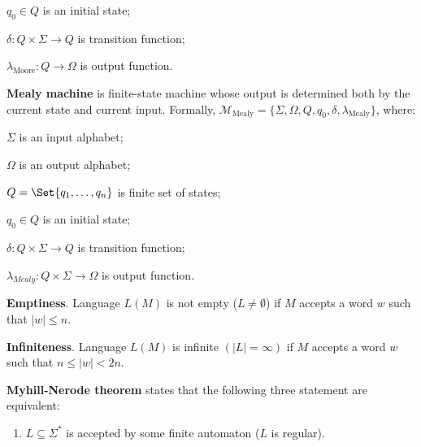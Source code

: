 \documentclass[a4paper,10pt]{article}
\begin{document}
\begin{terms}
\begin{terms}
        \item $q_0 \in Q$ is an initial state;

        \item $\delta \colon Q \times \Sigma \to Q$ is transition function;

        \item $\lambda_\text{Moore} \colon Q \to \Omega$ is output function.
    \end{terms}

    \item \textbf{Mealy machine} is finite-state machine whose output is determined both by the current state and current input.
    Formally, $\mathcal{M}_\text{Mealy} = \{\Sigma, \Omega, Q, q_0, \delta, \lambda_\text{Mealy}\}$, where:

    \begin{terms}
        \item $\Sigma$ is an input alphabet;

        \item $\Omega$ is an output alphabet;

        \item $Q = \Set{q_1, \dots, q_n}$ is finite set of states;

        \item $q_0 \in Q$ is an initial state;

        \item $\delta \colon Q \times \Sigma \to Q$ is transition function;

        \item $\lambda_{Mealy} \colon Q \times \Sigma \to \Omega$ is output function.
    \end{terms}

    \item \textbf{Emptiness}. Language $L(M)$ is not empty ($L \neq \emptyset$) if $M$ accepts a word $w$ such that $|w| \leq n$.

    \item \textbf{Infiniteness}. Language $L(M)$ is infinite $(|L| = \infty)$ if $M$ accepts a word $w$ such that $n \leq |w| < 2n$.

    \item \textbf{Myhill-Nerode theorem} states that the following three statement are equivalent:
    \begin{enumerate}
        \item $L \subseteq \Sigma^*$ is accepted by some finite automaton ($L$ is regular).


\end{enumerate}
\end{terms}
\end{document}
